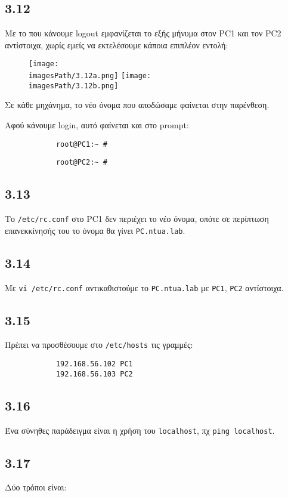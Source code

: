 \documentclass[a4paper, 12pt]{article}
\newcommand{\imagesPath}{.}
\begin{document}
	\subsection*{3.12}
		Με το που κάνουμε logout εμφανίζεται το εξής μήνυμα στον PC1 και τον PC2 αντίστοιχα, χωρίς εμείς να εκτελέσουμε κάποια επιπλέον εντολή:
		
		\begin{figure}[H]
			\texttt{[image: \\imagesPath/3.12a.png]}
			\texttt{[image: \\imagesPath/3.12b.png]}		
		\end{figure}		
		
		Σε κάθε μηχάνημα, το νέο όνομα που αποδώσαμε φαίνεται στην παρένθεση.
		
		Αφού κάνουμε login, αυτό φαίνεται και στο prompt: 
		\begin{verbatim}
			root@PC1:~ #
		\end{verbatim} 
		\begin{verbatim}
			root@PC2:~ #
		\end{verbatim}

	\subsection*{3.13}
		Το \verb|/etc/rc.conf| στο PC1 δεν περιέχει το νέο όνομα, οπότε σε περίπτωση επανεκκίνησής του το όνομα θα γίνει \verb|PC.ntua.lab|.

	\subsection*{3.14}
		Με \verb|vi /etc/rc.conf| αντικαθιστούμε το \verb|PC.ntua.lab| με \verb|PC1|, \verb|PC2| αντίστοιχα.

	\subsection*{3.15}
		Πρέπει να προσθέσουμε στο \verb|/etc/hosts| τις γραμμές: 
		
		\begin{verbatim}
			192.168.56.102 PC1
			192.168.56.103 PC2
		\end{verbatim}

	\subsection*{3.16}
		Ένα σύνηθες παράδειγμα είναι η χρήση του \verb|localhost|, πχ \verb|ping localhost|.

	\subsection*{3.17}
		Δύο τρόποι είναι:
		
\end{document}
